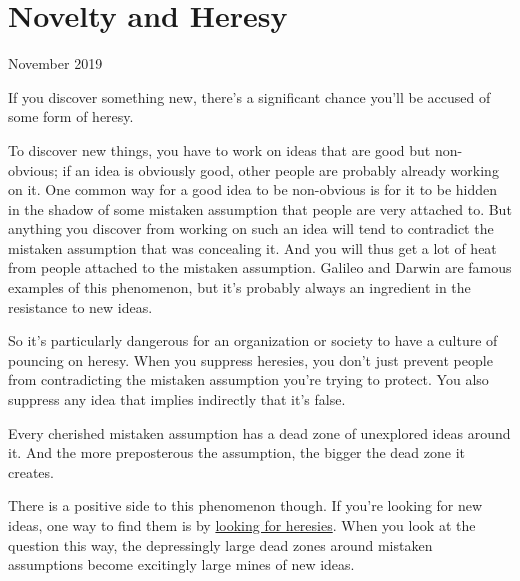 \chapter{Novelty and Heresy}

November 2019

If you discover something new, there's a significant chance you'll be
accused of some form of heresy.

To discover new things, you have to work on ideas that are good but
non-obvious; if an idea is obviously good, other people are probably
already working on it. One common way for a good idea to be non-obvious
is for it to be hidden in the shadow of some mistaken assumption that
people are very attached to. But anything you discover from working on
such an idea will tend to contradict the mistaken assumption that was
concealing it. And you will thus get a lot of heat from people attached
to the mistaken assumption. Galileo and Darwin are famous examples of
this phenomenon, but it's probably always an ingredient in the
resistance to new ideas.

So it's particularly dangerous for an organization or society to have a
culture of pouncing on heresy. When you suppress heresies, you don't
just prevent people from contradicting the mistaken assumption you're
trying to protect. You also suppress any idea that implies indirectly
that it's false.

Every cherished mistaken assumption has a dead zone of unexplored ideas
around it. And the more preposterous the assumption, the bigger the dead
zone it creates.

There is a positive side to this phenomenon though. If you're looking
for new ideas, one way to find them is by \href{say.html}{looking for
heresies}. When you look at the question this way, the depressingly
large dead zones around mistaken assumptions become excitingly large
mines of new ideas.